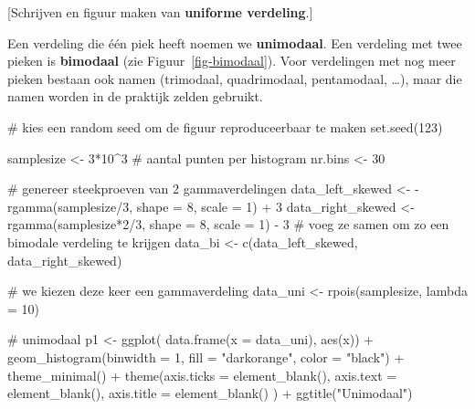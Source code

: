 \documentclass[
  a4paper,
]{scrbook}
\newenvironment{Shaded}{\begin{snugshade}}{\end{snugshade}}
\newcommand{\AttributeTok}[1]{\textcolor[rgb]{0.40,0.45,0.13}{#1}}
\newcommand{\CommentTok}[1]{\textcolor[rgb]{0.37,0.37,0.37}{#1}}
\newcommand{\DecValTok}[1]{\textcolor[rgb]{0.68,0.00,0.00}{#1}}
\newcommand{\FunctionTok}[1]{\textcolor[rgb]{0.28,0.35,0.67}{#1}}
\newcommand{\NormalTok}[1]{\textcolor[rgb]{0.00,0.23,0.31}{#1}}
\newcommand{\OtherTok}[1]{\textcolor[rgb]{0.00,0.23,0.31}{#1}}
\newcommand{\SpecialCharTok}[1]{\textcolor[rgb]{0.37,0.37,0.37}{#1}}
\newcommand{\StringTok}[1]{\textcolor[rgb]{0.13,0.47,0.30}{#1}}
\theoremstyle{definition}
\theoremstyle{definition}
\theoremstyle{remark}
\begin{document}
{[}Schrijven en figuur maken van \textbf{uniforme verdeling}.{]}

Een verdeling die één piek heeft noemen we \textbf{unimodaal}. Een
verdeling met twee pieken is \textbf{bimodaal} (zie
Figuur~\ref{fig-bimodaal}). Voor verdelingen met nog meer pieken bestaan
ook namen (trimodaal, quadrimodaal, pentamodaal, \ldots), maar die namen
worden in de praktijk zelden gebruikt.

\begin{Shaded}
\begin{Highlighting}[]
\CommentTok{\# kies een random seed om de figuur reproduceerbaar te maken}
\FunctionTok{set.seed}\NormalTok{(}\DecValTok{123}\NormalTok{)}

\NormalTok{samplesize }\OtherTok{\textless{}{-}} \DecValTok{3}\SpecialCharTok{*}\DecValTok{10}\SpecialCharTok{\^{}}\DecValTok{3} \CommentTok{\# aantal punten per histogram}
\NormalTok{nr.bins }\OtherTok{\textless{}{-}} \DecValTok{30}

\CommentTok{\# genereer steekproeven van 2 gammaverdelingen}
\NormalTok{data\_left\_skewed }\OtherTok{\textless{}{-}} \SpecialCharTok{{-}}\FunctionTok{rgamma}\NormalTok{(samplesize}\SpecialCharTok{/}\DecValTok{3}\NormalTok{, }\AttributeTok{shape =} \DecValTok{8}\NormalTok{, }\AttributeTok{scale =} \DecValTok{1}\NormalTok{) }\SpecialCharTok{+} \DecValTok{3}
\NormalTok{data\_right\_skewed }\OtherTok{\textless{}{-}} \FunctionTok{rgamma}\NormalTok{(samplesize}\SpecialCharTok{*}\DecValTok{2}\SpecialCharTok{/}\DecValTok{3}\NormalTok{, }\AttributeTok{shape =} \DecValTok{8}\NormalTok{, }\AttributeTok{scale =} \DecValTok{1}\NormalTok{) }\SpecialCharTok{{-}} \DecValTok{3}
\CommentTok{\# voeg ze samen om zo een bimodale verdeling te krijgen}
\NormalTok{data\_bi }\OtherTok{\textless{}{-}} \FunctionTok{c}\NormalTok{(data\_left\_skewed, data\_right\_skewed)}

\CommentTok{\# we kiezen deze keer een gammaverdeling }
\NormalTok{data\_uni }\OtherTok{\textless{}{-}} \FunctionTok{rpois}\NormalTok{(samplesize, }\AttributeTok{lambda =} \DecValTok{10}\NormalTok{)}


\CommentTok{\# unimodaal}
\NormalTok{p1 }\OtherTok{\textless{}{-}} \FunctionTok{ggplot}\NormalTok{(}
  \FunctionTok{data.frame}\NormalTok{(}\AttributeTok{x =}\NormalTok{ data\_uni), }\FunctionTok{aes}\NormalTok{(x)) }\SpecialCharTok{+}
  \FunctionTok{geom\_histogram}\NormalTok{(}\AttributeTok{binwidth =} \DecValTok{1}\NormalTok{, }\AttributeTok{fill =} \StringTok{"darkorange"}\NormalTok{, }\AttributeTok{color =} \StringTok{"black"}\NormalTok{) }\SpecialCharTok{+}
  \FunctionTok{theme\_minimal}\NormalTok{() }\SpecialCharTok{+}
  \FunctionTok{theme}\NormalTok{(}\AttributeTok{axis.ticks =} \FunctionTok{element\_blank}\NormalTok{(),}
        \AttributeTok{axis.text =} \FunctionTok{element\_blank}\NormalTok{(),}
        \AttributeTok{axis.title =} \FunctionTok{element\_blank}\NormalTok{()}
\NormalTok{        ) }\SpecialCharTok{+}
  \FunctionTok{ggtitle}\NormalTok{(}\StringTok{"Unimodaal"}\NormalTok{)}


\end{Highlighting}
\end{Shaded}
\end{document}
